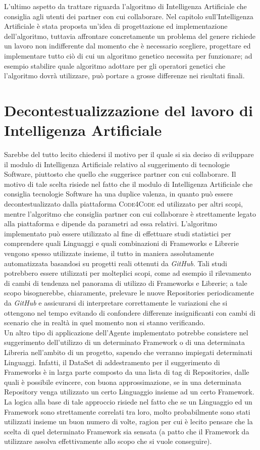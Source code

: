 L'ultimo aspetto da trattare riguarda l'algoritmo di Intelligenza Artificiale che consiglia agli utenti dei partner con cui collaborare. Nel capitolo sull'Intelligenza Artificiale è stata proposta un'idea di progettazione ed implementazione dell'algoritmo, tuttavia affrontare concretamente un problema del genere richiede un lavoro non indifferente dal momento che è necessario scegliere, progettare ed implementare tutto ciò di cui un algoritmo genetico necessita per funzionare; ad esempio stabilire quale algoritmo adottare per gli operatori genetici che l'algoritmo dovrà utilizzare, può portare a grosse differenze nei risultati finali. 
\section{Decontestualizzazione del lavoro di Intelligenza Artificiale}
Sarebbe del tutto lecito chiedersi il motivo per il quale si sia deciso di sviluppare il modulo di Intelligenza Artificiale relativo al suggerimento di tecnologie Software, piuttosto che quello che suggerisce partner con cui collaborare. Il motivo di tale scelta risiede nel fatto che il modulo di Intelligenza Artificiale che consiglia tecnologie Software ha una duplice valenza, in quanto può essere decontestualizzato dalla piattaforma \textsc{Code4Code} ed utilizzato per altri scopi, mentre l'algoritmo che consiglia partner con cui collaborare è strettamente legato alla piattaforma e dipende da parametri ad essa relativi. L'algoritmo implementato può essere utilizzato al fine di effettuare studi statistici per comprendere quali Linguaggi e quali combinazioni di Frameworks e Librerie vengono spesso utilizzate insieme, il tutto in maniera assolutamente automatizzata basandosi su progetti reali ottenuti da \emph{GitHub}. Tali studi potrebbero essere utilizzati per molteplici scopi, come ad esempio il rilevamento di cambi di tendenza nel panorama di utilizzo di Frameworks e Librerie; a tale scopo bisognerebbe, chiaramente, prelevare le nuove Repositories periodicamente da \emph{GitHub} e assicurarsi di interpretare correttamente le variazioni che si ottengono nel tempo evitando di confondere differenze insignificanti con cambi di scenario che in realtà in quel momento non si stanno verificando.\\
Un altro tipo di applicazione dell'Agente implementato potrebbe consistere nel suggerimento dell'utilizzo di un determinato Framework o di una determinata Libreria nell'ambito di un progetto, sapendo che verranno impiegati determinati Linguaggi. Infatti, il DataSet di addestramento per il suggerimento di Frameworks è in larga parte composto da una lista di tag di Repositories, dalle quali è possibile evincere, con buona approssimazione, se in una determinata Repository venga utilizzato un certo Linguaggio insieme ad un certo Framework. La logica alla base di tale approccio risiede nel fatto che se un Linguaggio ed un Framework sono strettamente correlati tra loro, molto probabilmente sono stati utilizzati insieme un buon numero di volte, ragion per cui è lecito pensare che la scelta di quel determinato Framework sia sensata (a patto che il Framework da utilizzare assolva effettivamente allo scopo che si vuole conseguire). 

